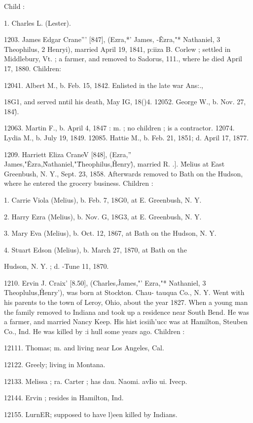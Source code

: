 Child : 

1. Charles L. (Lester). 

1203. James Edgar Crane''' [847], (Ezra,*' James, -\^ Ezra,"* 
Nathaniel, 3 Theophilus, 2 Henryi), married April 19, 1841, p:iiza 
B. Corlew ; settled in Middlebury, Vt. ; a farmer, and removed 
to Sadorus, 111., where he died April 17, 1880. Children: 

12041. Albert M., b. Feb. 15, 1842. Enlisted in the late war Ans:., 

18G1, and served nntil his death, May IG, 18()4. 
12052. George W., b. Nov. 27, 184\^). 

12063. Martin F., b. April 4, 1847 : m. ; no children ; is a contractor. 
12074. Lydia M., b. July 19, 1849. 
12085. Hattie M., b. Feb. 21, 1851; d. April 17, 1877. 

1209. Harriett Eliza CraneV [848], (Ezra,'' James,"\^ Ezra,\^ 
Nathaniel,"\^ Theophilus,\^ Henry\^), married R. .]. \^Melius at East 
Greenbush, N. Y., Sept. 23, 1858. Afterwards removed to Bath 
on the Hudson, where he entered the grocery business. Children : 

1. Carrie Viola (Melius), b. Feb. 7, 18G0, at E. Greenbush, N. Y. 

2. Harry Ezra (Melius), b. Nov. G, 18G3, at E. Greenbush, N. Y. 

3. Mary Eva (Melius), b. Oct. 12, 1867, at Bath on the Hudson, N. Y. 

4. Stuart Edson (Melius), b. March 27, 1870, at Bath on the 

Hudson, N. Y. ; d. -Tune 11, 1870. 

1210. Ervin J. Craix' [8.50], (Charles,\^ James,"' Ezra,"* 
Nathaniel, 3 Theoplulus,\^ Henry'), was born at Stockton. Chau- 
tauqua Co., N. Y. Went with his parents to the town of Leroy, 
Ohio, about the year 1827. When a young man the family 
removed to Indiana and took up a residence near South Bend. 
He was a farmer, and married Nancy Keep. His hist icsiih'ucc 
was at Hamilton, Steuben Co., Ind. He was killed by :i hull 
some years ago. Children : 

12111. Thomas; m. and living near Los Angeles, Cal. 

12122. Greely; living in Montana. 

12133. Melissa ; ra. Carter ; has dau. Naomi. avIio ui. Ivecp. 

12144. Ervin ; resides in Hamilton, Ind. 

12155. LurnER; supposed to have l)een killed by Indians. 




